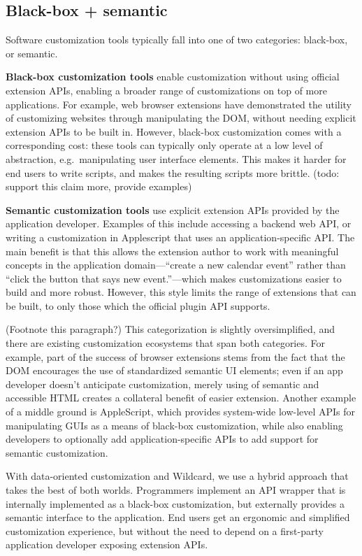 \documentclass[sigplan,10pt,anonymous,review]{acmart}
\begin{document}
\hypertarget{black-box-semantic}{%
\subsection{Black-box + semantic}\label{black-box-semantic}}

Software customization tools typically fall into one of two categories:
black-box, or semantic.

\textbf{Black-box customization tools} enable customization without
using official extension APIs, enabling a broader range of
customizations on top of more applications. For example, web browser
extensions have demonstrated the utility of customizing websites through
manipulating the DOM, without needing explicit extension APIs to be
built in. However, black-box customization comes with a corresponding
cost: these tools can typically only operate at a low level of
abstraction, e.g.~manipulating user interface elements. This makes it
harder for end users to write scripts, and makes the resulting scripts
more brittle. (todo: support this claim more, provide examples)

\textbf{Semantic customization tools} use explicit extension APIs
provided by the application developer. Examples of this include
accessing a backend web API, or writing a customization in Applescript
that uses an application-specific API. The main benefit is that this
allows the extension author to work with meaningful concepts in the
application domain---``create a new calendar event'' rather than ``click
the button that says new event.''---which makes customizations easier to
build and more robust. However, this style limits the range of
extensions that can be built, to only those which the official plugin
API supports.

(Footnote this paragraph?) This categorization is slightly
oversimplified, and there are existing customization ecosystems that
span both categories. For example, part of the success of browser
extensions stems from the fact that the DOM encourages the use of
standardized semantic UI elements; even if an app developer doesn't
anticipate customization, merely using of semantic and accessible HTML
creates a collateral benefit of easier extension. Another example of a
middle ground is AppleScript, which provides system-wide low-level APIs
for manipulating GUIs as a means of black-box customization, while also
enabling developers to optionally add application-specific APIs to add
support for semantic customization.

With data-oriented customization and Wildcard, we use a hybrid approach
that takes the best of both worlds. Programmers implement an API wrapper
that is internally implemented as a black-box customization, but
externally provides a semantic interface to the application. End users
get an ergonomic and simplified customization experience, but without
the need to depend on a first-party application developer exposing
extension APIs.
\end{document}
